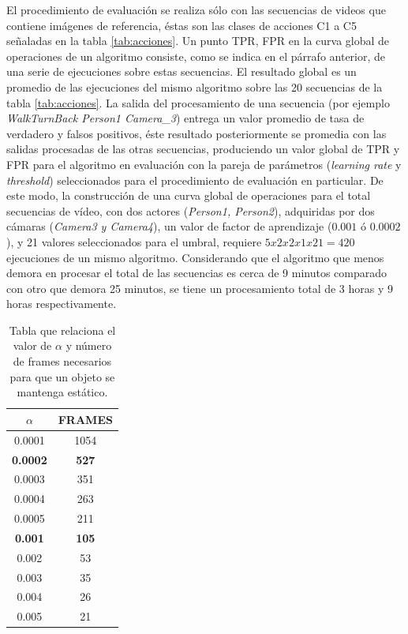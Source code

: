 El procedimiento de evaluación se realiza sólo con las secuencias de videos que contiene imágenes de referencia, éstas son las clases de acciones C1 a C5 señaladas en la tabla \ref{tab:acciones}. Un punto TPR, FPR en la curva global de operaciones de un algoritmo consiste, como se indica en el párrafo anterior, de una serie de ejecuciones sobre estas secuencias. El resultado global es un promedio de las ejecuciones del mismo algoritmo sobre las 20 secuencias de la tabla \ref{tab:acciones}. La salida del procesamiento de una secuencia (por ejemplo \textit{WalkTurnBack Person1 Camera\_3}) entrega un valor promedio de tasa de verdadero y falsos positivos, éste resultado posteriormente se promedia con las salidas procesadas de las otras secuencias, produciendo un valor global de TPR y FPR para el algoritmo en evaluación con la pareja de parámetros (\textit{learning rate} y \textit{threshold}) seleccionados para el procedimiento de evaluación en particular. De este modo, la construcción de una curva global de operaciones para el total secuencias de vídeo, con dos actores (\textit{Person1, Person2}), adquiridas por dos cámaras (\textit{Camera3 y Camera4}), un valor de factor de aprendizaje ($0.001$ ó $0.0002$), y 21 valores seleccionados para el umbral, requiere $5x2x2x1x21=420$ ejecuciones de un mismo algoritmo. Considerando que el algoritmo que menos demora en procesar el total de las secuencias es cerca de 9 minutos comparado con otro que demora 25 minutos, se tiene un procesamiento total de 3 horas y 9 horas respectivamente.




\begin{table}
\centering
\begin{tabular}{ c | c  }
\hline
$\alpha$ & FRAMES \\ \hline
0.0001 & 1054 \\ \hline
\textbf{0.0002} & \textbf{527} \\ \hline
0.0003 & 351 \\ \hline
0.0004 & 263 \\ \hline
0.0005 & 211 \\ \hline
\textbf{0.001} & \textbf{105} \\ \hline
0.002 & 53 \\ \hline
0.003 & 35 \\ \hline
0.004 & 26 \\ \hline
0.005 & 21 \\ \hline
\hline
\end{tabular}
\caption[Tabla que relaciona el valor de $\alpha$ y número de frames necesarios para que un objeto se mantenga estático.]{Tabla que relaciona el valor de $\alpha$ y número de frames necesarios para que un objeto se mantenga estático.}
\label{tab:frames}
\end{table}



